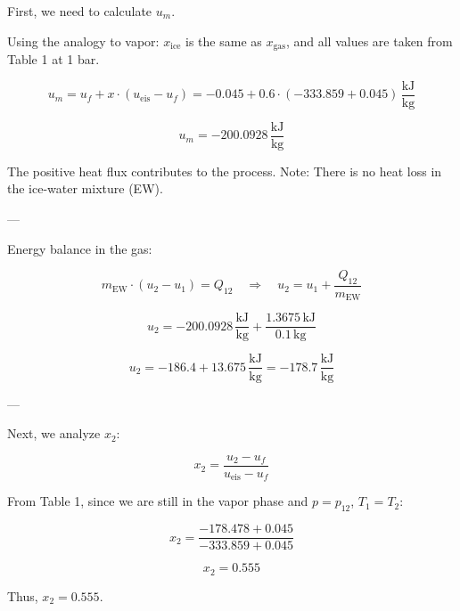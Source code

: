 First, we need to calculate \( u_m \).  

Using the analogy to vapor: \( x_{\text{ice}} \) is the same as \( x_{\text{gas}} \), and all values are taken from Table 1 at 1 bar.  

\[
u_m = u_f + x \cdot (u_{\text{eis}} - u_f) = -0.045 + 0.6 \cdot (-333.859 + 0.045) \, \frac{\text{kJ}}{\text{kg}}
\]

\[
u_m = -200.0928 \, \frac{\text{kJ}}{\text{kg}}
\]

The positive heat flux contributes to the process.  
Note: There is no heat loss in the ice-water mixture (EW).  

---

Energy balance in the gas:  

\[
m_{\text{EW}} \cdot (u_2 - u_1) = Q_{12} \quad \Rightarrow \quad u_2 = u_1 + \frac{Q_{12}}{m_{\text{EW}}}
\]

\[
u_2 = -200.0928 \, \frac{\text{kJ}}{\text{kg}} + \frac{1.3675 \, \text{kJ}}{0.1 \, \text{kg}}
\]

\[
u_2 = -186.4 + 13.675 \, \frac{\text{kJ}}{\text{kg}} = -178.7 \, \frac{\text{kJ}}{\text{kg}}
\]

---

Next, we analyze \( x_2 \):  

\[
x_2 = \frac{u_2 - u_f}{u_{\text{eis}} - u_f}
\]

From Table 1, since we are still in the vapor phase and \( p = p_{12} \), \( T_1 = T_2 \):  

\[
x_2 = \frac{-178.478 + 0.045}{-333.859 + 0.045}
\]

\[
x_2 = 0.555
\]

Thus, \( x_2 = 0.555 \).